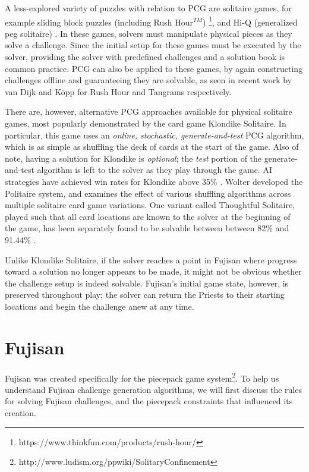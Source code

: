 \documentclass[10pt,journal,compsoc]{IEEEtran}
\begin{document}
A less-explored variety of puzzles with relation to PCG 
are solitaire games, for example
sliding block puzzles \cite{FIFTEEN} (including Rush Hour$^{TM}$) \footnote{https://www.thinkfun.com/products/rush-hour/}, 
and Hi-Q (generalized peg solitaire) \cite{PEG}. In these games, solvers must manipulate physical pieces as they solve a challenge. Since the initial setup for these games must be executed by the solver, providing the solver with predefined challenges and a solution book is common practice. PCG can also be applied to these games, by again constructing challenges offline and guaranteeing they are solvable, as seen in recent work by van Dijk \cite{RUSHHOUR} and K{\"o}pp \cite{TANGRAM} for Rush Hour and Tangrams respectively. 

There are, however, alternative PCG approaches available for physical solitaire games, most popularly demonstrated by the card game Klondike Solitaire. In particular, this game uses an {\it online, stochastic, generate-and-test} PCG algorithm, which is as simple as shuffling the deck of cards at the start of the game. Also of note, having a solution for Klondike is {\it optional}; the {\it test} portion of the generate-and-test algorithm is left to the solver as they play through the game. AI strategies have achieved win rates for Klondike above 35\% \cite{KLONDIKEPLANNING}. Wolter \cite{SOLITAIREVARIANTS} developed the Politaire system, and examines the effect of various shuffling algorithms across multiple solitaire card game variations. One variant called Thoughtful Solitaire, played such that all card locations are known to the solver at the beginning of the game, has been separately found to be solvable between between 82\% and 91.44\% \cite{THOUGHTFUL}.

Unlike Klondike Solitaire, if the solver reaches a point in Fujisan where progress toward a solution no longer appears to be made, it might not be obvious whether the challenge setup is indeed solvable. Fujisan's initial game state, however, is preserved throughout play; the solver can return the Priests to their starting locations and begin the challenge anew at any time.

\noindent

\section{Fujisan}

Fujisan was created specifically for the piecepack game system\footnote{http://www.ludism.org/ppwiki/SolitaryConfinement}. To help us understand Fujisan challenge generation algorithms, we will first discuss the rules for solving Fujisan challenges, and the piecepack constraints that influenced its creation.
\end{document}
